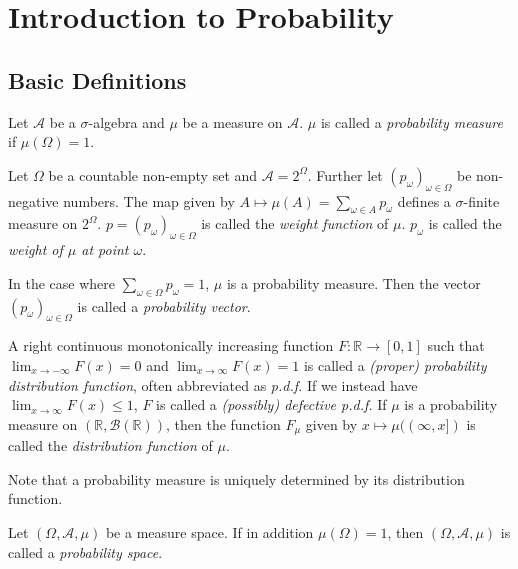 \section{Introduction to Probability}

\subsection{Basic Definitions}

\begin{definition}
    Let $\mathcal{A}$ be a $\sigma$-algebra and $\mu$ be a measure on $\mathcal{A}$. $\mu$ is called a \textit{probability measure} if $\mu(\Omega)=1$.
\end{definition}

Let $\Omega$ be a countable non-empty set and $\mathcal{A}=2^\Omega$. Further let $(p_\omega)_{\omega\in\Omega}$ be non-negative numbers. The map given by $A\mapsto\mu(A)=\sum_{\omega\in A}p_\omega$ defines a $\sigma$-finite measure on $2^\Omega$. $p=(p_\omega)_{\omega\in\Omega}$ is called the \textit{weight function} of $\mu$. $p_\omega$ is called the \textit{weight of $\mu$ at point $\omega$}.

In the case where $\sum_{\omega\in\Omega}p_\omega=1$, $\mu$ is a probability measure. Then the vector $(p_\omega)_{\omega\in\Omega}$ is called a \textit{probability vector}. 

\begin{definition}
    A right continuous monotonically increasing function $F:\mathbb{R}\to[0,1]$ such that $\lim_{x\to-\infty}F(x)=0$ and $\lim_{x\to\infty}F(x)=1$ is called a \textit{(proper) probability distribution function}, often abbreviated as \textit{p.d.f.} If we instead have $\lim_{x\to\infty}F(x)\leq 1$, $F$ is called a \textit{(possibly) defective p.d.f.} If $\mu$ is a probability measure on $(\mathbb{R},\mathcal{B}(\mathbb{R}))$, then the function $F_\mu$ given by $x\mapsto \mu((\infty,x])$ is called the \textit{distribution function} of $\mu$.
\end{definition}

Note that a probability measure is uniquely determined by its distribution function.

\begin{definition}
    Let $(\Omega,\mathcal{A},\mu)$ be a measure space. If in addition $\mu(\Omega)=1$, then $(\Omega,\mathcal{A},\mu)$ is called a \textit{probability space}.
\end{definition}

